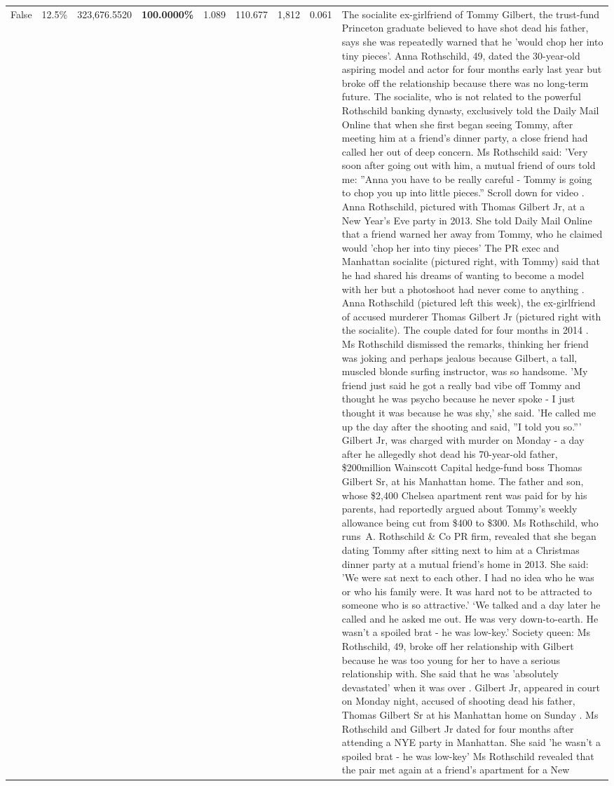 \begin{table}[H]
\begin{tabular}{lllrlllll}
False & 12.5\% & 323,676.5520 & \bfseries \color{red} 100.0000\% & 1.089 & 110.677 & 1,812 & 0.061 & The socialite ex-girlfriend of Tommy Gilbert, the trust-fund Princeton graduate believed to have shot dead his father, says she was repeatedly warned that he 'would chop her into tiny pieces'. Anna Rothschild, 49, dated the 30-year-old aspiring model and actor for four months early last year but broke off the relationship because there was no long-term future. The socialite, who is not related to the powerful Rothschild banking dynasty, exclusively told the Daily Mail Online that when she first began seeing Tommy, after meeting him at a friend's dinner party, a close friend had called her out of deep concern. Ms Rothschild said: 'Very soon after going out with him, a mutual friend of ours told me: ''Anna you have to be really careful - Tommy is going to chop you up into little pieces.'' Scroll down for video . Anna Rothschild, pictured with Thomas Gilbert Jr, at a New Year's Eve party in 2013. She told Daily Mail Online that a friend warned her away from Tommy, who he claimed would 'chop her into tiny pieces' The PR exec and Manhattan socialite (pictured right, with Tommy) said that he had shared his dreams of wanting to become a model with her but a photoshoot had never come to anything . Anna Rothschild (pictured left this week), the ex-girlfriend of accused murderer Thomas Gilbert Jr (pictured right with the socialite). The couple dated for four months in 2014 . Ms Rothschild dismissed the remarks, thinking her friend was joking and perhaps jealous because Gilbert, a tall, muscled blonde surfing instructor, was so handsome. 'My friend just said he got a really bad vibe off Tommy and thought he was psycho because he never spoke - I just thought it was because he was shy,' she said. 'He called me up the day after the shooting and said, ''I told you so.''' Gilbert Jr, was charged with murder on Monday - a day after he allegedly shot dead his 70-year-old father, \$200million Wainscott Capital hedge-fund boss Thomas Gilbert Sr, at his Manhattan home. The father and son, whose \$2,400 Chelsea apartment rent was paid for by his parents, had reportedly argued about Tommy's weekly allowance being cut from \$400 to \$300. Ms Rothschild, who runs A. Rothschild \& Co PR firm, revealed that she began dating Tommy after sitting next to him at a Christmas dinner party at a mutual friend's home in 2013. She said: 'We were sat next to each other. I had no idea who he was or who his family were. It was hard not to be attracted to someone who is so attractive.' ‘We talked and a day later he called and he asked me out. He was very down-to-earth. He wasn’t a spoiled brat - he was low-key.’ Society queen: Ms Rothschild, 49, broke off her relationship with Gilbert because he was too young for her to have a serious relationship with. She said that he was 'absolutely devastated' when it was over . Gilbert Jr, appeared in court on Monday night, accused of shooting dead his father, Thomas Gilbert Sr at his Manhattan home on Sunday . Ms Rothschild and Gilbert Jr dated for four months after attending a NYE party in Manhattan. She said 'he wasn't a spoiled brat - he was low-key' Ms Rothschild revealed that the pair met again at a friend’s apartment for a New 
\end{tabular}
\end{table}
